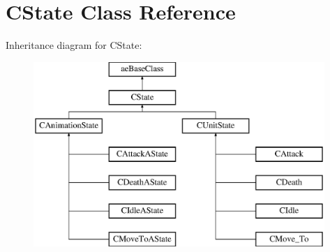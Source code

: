 \hypertarget{class_c_state}{}\section{C\+State Class Reference}
\label{class_c_state}
Inheritance diagram for C\+State\+:\begin{figure}[H]
\begin{center}
\leavevmode
\includegraphics[height=7.000000cm]{class_c_state}
\end{center}
\end{figure}
